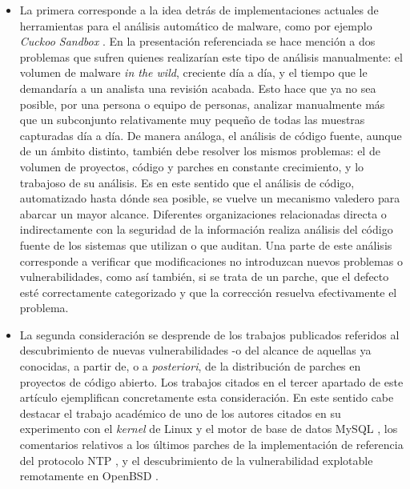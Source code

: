 \documentclass[11pt,a4paper]{article}
\begin{document}
\begin{itemize}

\item La primera corresponde a la idea detrás de implementaciones actuales de herramientas para el análisis automático de malware, como por ejemplo \textit{Cuckoo Sandbox} \cite{cuckoo}. En la presentación referenciada se hace mención a dos problemas que sufren quienes realizarían este tipo de análisis manualmente: el volumen de malware \textit{in the wild}, creciente día a día, y el tiempo que le demandaría a un analista una revisión acabada. Esto hace que ya no sea posible, por una persona o equipo de personas, analizar manualmente más que un subconjunto relativamente muy pequeño de todas las muestras capturadas día a día. De manera análoga, el análisis de código fuente, aunque de un ámbito distinto, también debe resolver los mismos problemas: el de volumen de proyectos, código y parches en constante crecimiento, y lo trabajoso de su análisis. Es en este sentido que el análisis de código, automatizado hasta dónde sea posible, se vuelve un mecanismo valedero para abarcar un mayor alcance. Diferentes organizaciones relacionadas directa o indirectamente con la seguridad de la información realiza análisis del código fuente de los sistemas que utilizan o que auditan. Una parte de este análisis corresponde a verificar que modificaciones no introduzcan nuevos problemas o vulnerabilidades, como así también, si se trata de un parche, que el defecto esté correctamente categorizado y que la corrección resuelva efectivamente el problema.

\item La segunda consideración se desprende de los trabajos publicados referidos al descubrimiento de nuevas vulnerabilidades -o del alcance de aquellas ya conocidas, a partir de, o a \textit{posteriori}, de la distribución de parches en proyectos de código abierto. Los trabajos citados en el tercer apartado de este artículo ejemplifican concretamente esta consideración. En este sentido cabe destacar el trabajo académico de uno de los autores citados en su experimento con el \textit{kernel} de Linux y el motor de base de datos MySQL \cite{Jason1,Jason2,Jason3,Jason4}, los comentarios relativos a los últimos parches de la implementación de referencia del protocolo NTP \cite{ntpBug1, ntpBug2}, y el descubrimiento de la vulnerabilidad explotable remotamente en OpenBSD \cite{openbsd2}.

\end{itemize}
\end{document}
